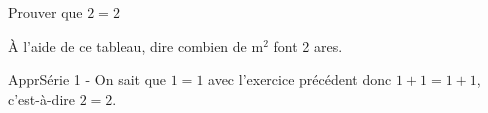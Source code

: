 \begin{exercice*}
    \partie
    Prouver que $2=2$

    \partie
    À l'aide de ce tableau, dire combien de $\text{m}^2$ font 2 ares.
\end{exercice*}
\begin{corrige}
    \setcounter{partie}{0} %
    \partie
    ApprSérie 1 - On sait que $1=1$ avec l’exercice précédent donc $1+1=1+1$,
    c’est-à-dire $2=2$.

    \partie
\end{corrige}
